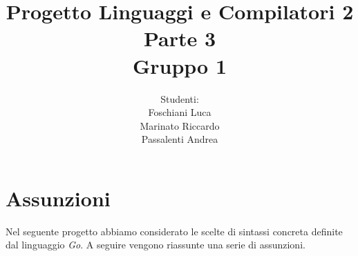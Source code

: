 \documentclass[12pt]{article}
\begin{document}
\title{\noindent \Huge Progetto Linguaggi e Compilatori 2\\ Parte 3 \\ Gruppo 1}
\date{}
\author{Studenti: \\Foschiani Luca\\ Marinato Riccardo \\Passalenti Andrea}

\maketitle
\newpage

\section*{Assunzioni}
Nel seguente progetto abbiamo considerato le scelte di sintassi concreta definite dal linguaggio \textit{Go}.
A seguire vengono riassunte una serie di assunzioni.
\end{document}
